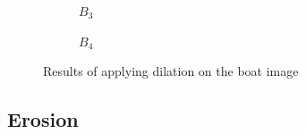 \documentclass[12pt]{article}
\renewcommand{\subfiguresize}{.25\textwidth}
\begin{document}
\begin{figure}[H]
\begin{subfigure}[t]{\subfiguresize}
        \caption{$B_3$}
    \end{subfigure}
    \hspace{2em}
    \begin{subfigure}[t]{\subfiguresize}\centering
        \caption{$B_4$}
    \end{subfigure}
    \hspace{2em}
    \caption{Results of applying dilation on the boat image}
\end{figure} 

\subsection{Erosion}
\end{document}
